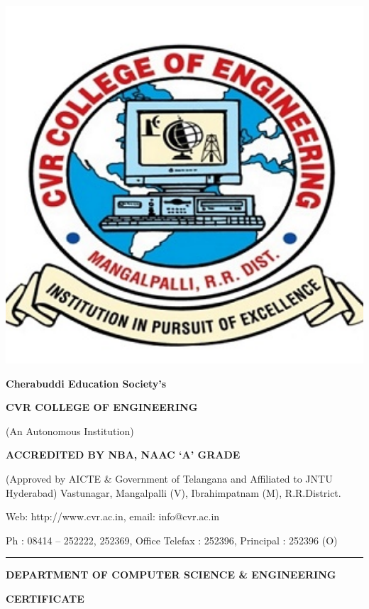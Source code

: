 \begin{minipage}{0.2\textwidth}
    \includegraphics[width=1\textwidth]{images/logo.jpg}
\end{minipage}
\hfill
\begin{minipage}{0.85\textwidth}
\centering
{\fontsize{16pt}{8pt}\selectfont 
    \textbf{Cherabuddi Education Society’s}
\par}
{\fontsize{16pt}{16pt}\selectfont 
    \textcolor{titleColor}{\textbf{\MakeUppercase{CVR COLLEGE OF ENGINEERING}}}
\par}
\textcolor{titleColor}{(An Autonomous Institution)}\par
\textbf{\MakeUppercase{ACCREDITED BY NBA, NAAC ‘A’ Grade}} \par
{\fontsize{9pt}{9pt}\selectfont 
(Approved by AICTE \& Government of Telangana and Affiliated to JNTU Hyderabad) Vastunagar, Mangalpalli (V), Ibrahimpatnam (M), R.R.District.\par
Web: http://www.cvr.ac.in, email: info@cvr.ac.in \par
Ph : 08414 – 252222, 252369, Office Telefax : 252396, Principal : 252396 (O)
\par}
\end{minipage}
\par\noindent\rule{\textwidth}{0.4pt}

\begin{center}
    \textbf{DEPARTMENT OF COMPUTER SCIENCE \& ENGINEERING}\par
    \textbf{CERTIFICATE}
\end{center}

